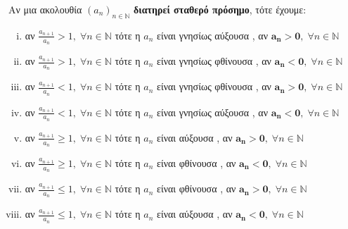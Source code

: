 \documentclass[main.tex]{subfiles}
\begin{document}
\begin{rem}\label{dfn:isodmono}
\item {}
  Αν μια ακολουθία $ (a_{n})_{n \in \mathbb{N}} $ \textbf{διατηρεί σταθερό πρόσημο}, 
  τότε έχουμε:
  \begin{enumerate}[i)]
    \item αν $ \frac{a_{n+1}}{a_{n}} > 1, \; \forall n \in \mathbb{N} $ τότε η $a_{n}$ 
      είναι \textcolor{Col\thechapter}{γνησίως αύξουσα} , 
    αν $ \bm {a_{n}>0}, \; \forall n \in \mathbb{N} $  
    \item αν $ \frac{a_{n+1}}{a_{n}} > 1, \; \forall n \in \mathbb{N} $ τότε η $a_{n}$ 
      είναι \textcolor{Col\thechapter}{γνησίως φθίνουσα} , 
    αν $ \bm {a_{n}<0}, \; \forall n \in \mathbb{N} $  
    \item αν $ \frac{a_{n+1}}{a_{n}} < 1, \; \forall n \in \mathbb{N} $ τότε η $a_{n}$ 
      είναι \textcolor{Col\thechapter}{γνησίως φθίνουσα} , 
    αν $ \bm {a_{n}>0}, \; \forall n \in \mathbb{N} $  
    \item αν $ \frac{a_{n+1}}{a_{n}} < 1, \; \forall n \in \mathbb{N} $ τότε η $a_{n}$ 
      είναι \textcolor{Col\thechapter}{γνησίως αύξουσα} , 
    αν $ \bm {a_{n}<0}, \; \forall n \in \mathbb{N} $  
    \item αν $ \frac{a_{n+1}}{a_{n}} \geq 1, \; \forall n \in \mathbb{N} $ 
      τότε η $a_{n}$ είναι \textcolor{Col\thechapter}{αύξουσα} , 
    αν $ \bm {a_{n}>0}, \; \forall n \in \mathbb{N} $  
    \item αν $ \frac{a_{n+1}}{a_{n}} \geq 1, \; \forall n \in \mathbb{N} $ 
      τότε η $a_{n}$ είναι \textcolor{Col\thechapter}{φθίνουσα} , 
    αν $ \bm {a_{n}<0}, \; \forall n \in \mathbb{N} $  
    \item αν $ \frac{a_{n+1}}{a_{n}} \leq 1, \; \forall n \in \mathbb{N} $ 
      τότε η $a_{n}$ είναι \textcolor{Col\thechapter}{φθίνουσα} , 
    αν $ \bm {a_{n}>0}, \; \forall n \in \mathbb{N} $  
    \item αν $ \frac{a_{n+1}}{a_{n}} \leq 1, \; \forall n \in \mathbb{N} $ 
      τότε η $a_{n}$ είναι \textcolor{Col\thechapter}{αύξουσα} , 
    αν $ \bm {a_{n}<0}, \; \forall n \in \mathbb{N} $  
  \end{enumerate}
\end{rem}
\end{document}
